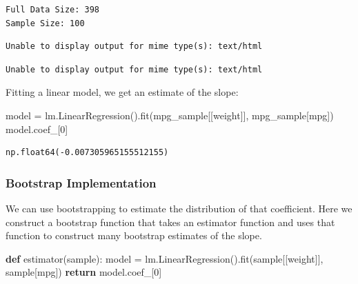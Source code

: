 \documentclass[
  letterpaper,
  DIV=11,
  numbers=noendperiod]{scrreprt}
\newenvironment{Shaded}{\begin{snugshade}}{\end{snugshade}}
\newcommand{\ControlFlowTok}[1]{\textcolor[rgb]{0.00,0.23,0.31}{\textbf{#1}}}
\newcommand{\DecValTok}[1]{\textcolor[rgb]{0.68,0.00,0.00}{#1}}
\newcommand{\KeywordTok}[1]{\textcolor[rgb]{0.00,0.23,0.31}{\textbf{#1}}}
\newcommand{\NormalTok}[1]{\textcolor[rgb]{0.00,0.23,0.31}{#1}}
\newcommand{\OperatorTok}[1]{\textcolor[rgb]{0.37,0.37,0.37}{#1}}
\newcommand{\StringTok}[1]{\textcolor[rgb]{0.13,0.47,0.30}{#1}}
\begin{document}
\begin{verbatim}
Full Data Size: 398
Sample Size: 100
\end{verbatim}

\begin{verbatim}
Unable to display output for mime type(s): text/html
\end{verbatim}

\begin{verbatim}
Unable to display output for mime type(s): text/html
\end{verbatim}

Fitting a linear model, we get an estimate of the slope:

\begin{Shaded}
\begin{Highlighting}[]
\NormalTok{model }\OperatorTok{=}\NormalTok{ lm.LinearRegression().fit(mpg\_sample[[}\StringTok{\textquotesingle{}weight\textquotesingle{}}\NormalTok{]], mpg\_sample[}\StringTok{\textquotesingle{}mpg\textquotesingle{}}\NormalTok{])}
\NormalTok{model.coef\_[}\DecValTok{0}\NormalTok{] }
\end{Highlighting}
\end{Shaded}

\begin{verbatim}
np.float64(-0.007305965155512155)
\end{verbatim}

\subsubsection{Bootstrap Implementation}\label{bootstrap-implementation}

We can use bootstrapping to estimate the distribution of that
coefficient. Here we construct a bootstrap function that takes an
estimator function and uses that function to construct many bootstrap
estimates of the slope.

\begin{Shaded}
\begin{Highlighting}[]
\KeywordTok{def}\NormalTok{ estimator(sample):}
\NormalTok{    model }\OperatorTok{=}\NormalTok{ lm.LinearRegression().fit(sample[[}\StringTok{\textquotesingle{}weight\textquotesingle{}}\NormalTok{]], sample[}\StringTok{\textquotesingle{}mpg\textquotesingle{}}\NormalTok{])}
    \ControlFlowTok{return}\NormalTok{ model.coef\_[}\DecValTok{0}\NormalTok{]}
\end{Highlighting}
\end{Shaded}
\end{document}
